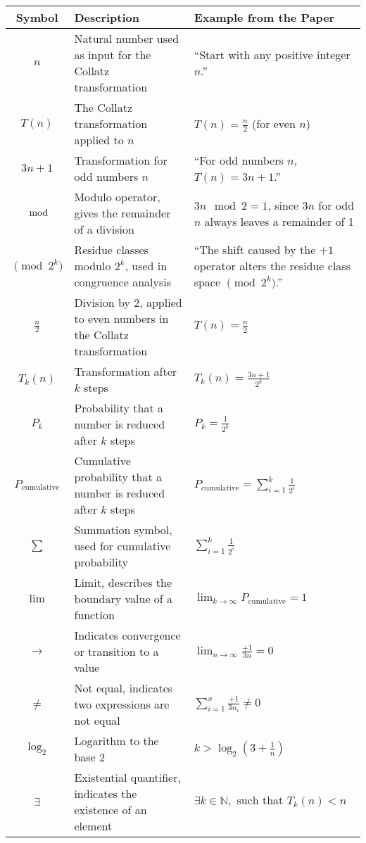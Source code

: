 \documentclass[a4paper,12pt]{article}
\begin{document}
\begin{table}[h!]
\centering
\begin{tabular}{|c|p{7cm}|p{5cm}|}
\hline
\textbf{Symbol} & \textbf{Description} & \textbf{Example from the Paper} \\ \hline
\( n \) & Natural number used as input for the Collatz transformation & “Start with any positive integer \( n \).” \\ \hline
\( T(n) \) & The Collatz transformation applied to \( n \) & \( T(n) = \frac{n}{2} \) (for even \( n \)) \\ \hline
\( 3n + 1 \) & Transformation for odd numbers \( n \) & “For odd numbers \( n \), \( T(n) = 3n + 1 \).” \\ \hline
\( \mod \) & Modulo operator, gives the remainder of a division & \( 3n \mod 2 = 1 \), since \( 3n \) for odd \( n \) always leaves a remainder of 1 \\ \hline
\( \pmod{2^k} \) & Residue classes modulo \( 2^k \), used in congruence analysis & “The shift caused by the \(+1\) operator alters the residue class space \( \pmod{2^k} \).” \\ \hline
\( \frac{n}{2} \) & Division by 2, applied to even numbers in the Collatz transformation & \( T(n) = \frac{n}{2} \) \\ \hline
\( T_k(n) \) & Transformation after \( k \) steps & \( T_k(n) = \frac{3n + 1}{2^k} \) \\ \hline
\( P_k \) & Probability that a number is reduced after \( k \) steps & \( P_k = \frac{1}{2^k} \) \\ \hline
\( P_{\text{cumulative}} \) & Cumulative probability that a number is reduced after \( k \) steps & \( P_{\text{cumulative}} = \sum_{i=1}^k \frac{1}{2^i} \) \\ \hline
\( \sum \) & Summation symbol, used for cumulative probability & \( \sum_{i=1}^k \frac{1}{2^i} \) \\ \hline
\( \lim \) & Limit, describes the boundary value of a function & \( \lim_{k \to \infty} P_{\text{cumulative}} = 1 \) \\ \hline
\( \to \) & Indicates convergence or transition to a value & \( \lim_{n \to \infty} \frac{+1}{3n} = 0 \) \\ \hline
\( \neq \) & Not equal, indicates two expressions are not equal & \( \sum_{i=1}^x \frac{+1}{3n_i} \neq 0 \) \\ \hline
\( \log_2 \) & Logarithm to the base 2 & \( k > \log_2(3 + \frac{1}{n}) \) \\ \hline
\( \exists \) & Existential quantifier, indicates the existence of an element & \( \exists k \in \mathbb{N}, \text{ such that } T_k(n) < n \) \\ \hline

\end{tabular}
\end{table}
\end{document}
